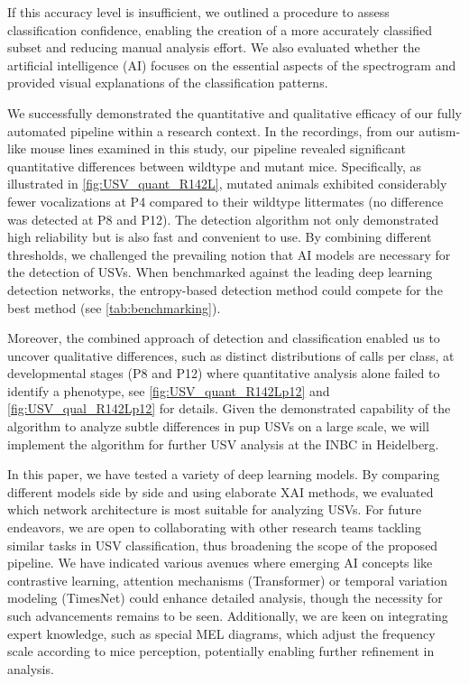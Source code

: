 \documentclass[preprint,NumberedRefs]{JASA}
\begin{document}
If this accuracy level is insufficient, we outlined a procedure to assess classification confidence, enabling the creation of a more accurately classified subset and reducing manual analysis effort. We also evaluated whether the artificial intelligence (AI) focuses on the essential aspects of the spectrogram and provided visual explanations of the classification patterns.

We successfully demonstrated the quantitative and qualitative efficacy of our fully automated pipeline within a research context. In the recordings, from our autism-like mouse lines examined in this study, our pipeline revealed significant quantitative differences between wildtype and mutant mice. Specifically, as illustrated in \autoref{fig:USV_quant_R142L}, mutated animals exhibited considerably fewer vocalizations at P4 compared to their wildtype littermates (no difference was detected at P8 and P12). The detection algorithm not only demonstrated high reliability but is also fast and convenient to use. By combining different thresholds, we challenged the prevailing notion that AI models are necessary for the detection of USVs. \cite{Steinfath2021-pe} When benchmarked against the leading deep learning detection networks, the entropy-based detection method could compete for the best method (see \autoref{tab:benchmarking}).

Moreover, the combined approach of detection and classification enabled us to uncover qualitative differences, such as distinct distributions of calls per class, at developmental stages (P8 and P12) where quantitative analysis alone failed to identify a phenotype, see \autoref{fig:USV_quant_R142Lp12} and \autoref{fig:USV_qual_R142Lp12} for details. Given the demonstrated capability of the algorithm to analyze subtle differences in pup USVs on a large scale, we will implement the algorithm for further USV analysis at the INBC in Heidelberg.

In this paper, we have tested a variety of deep learning models. By comparing different models side by side and using elaborate XAI methods, we evaluated which network architecture is most suitable for analyzing USVs. For future endeavors, we are open to collaborating with other research teams tackling similar tasks in USV classification, thus broadening the scope of the proposed pipeline. We have indicated various avenues where emerging AI concepts like contrastive learning, attention mechanisms (Transformer) or temporal variation modeling (TimesNet) could enhance detailed analysis, though the necessity for such advancements remains to be seen. \cite{attention, timesnet}
Additionally, we are keen on integrating expert knowledge, such as special MEL diagrams, which adjust the frequency scale according to mice perception, potentially enabling further refinement in analysis.
\end{document}
